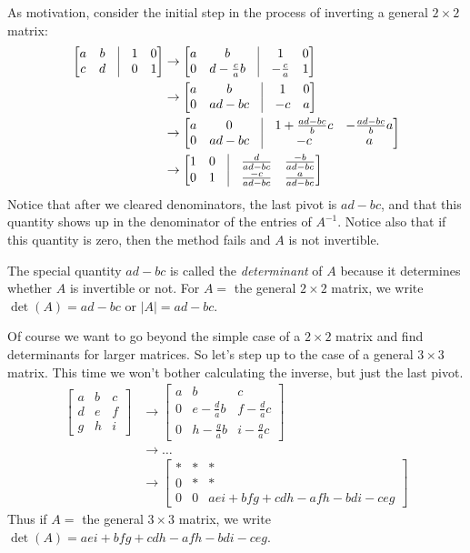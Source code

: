 \documentclass[11pt,oneside]{amsbook}
\theoremstyle{definition}
\theoremstyle{plain}
\theoremstyle{definition}
\theoremstyle{remark}
\numberwithin{equation}{section}
\numberwithin{figure}{section}
\begin{document}
As motivation, consider the initial step in the process of inverting a general $2\times2$ matrix:
\begin{align*}
  \begin{bmatrix}a&b&\vline&1&0\\c&d&\vline&0&1\end{bmatrix}
  &\to\begin{bmatrix}a&b&\vline&1&0\\
    0&d-\frac{c}{a}b&\vline&-\frac{c}{a}&1\end{bmatrix}\\
  &\to\begin{bmatrix}a&b&\vline&1&0\\0&ad-bc&\vline&-c&a\end{bmatrix}\\
  &\to\begin{bmatrix}a&0&\vline&1+\frac{ad-bc}{b}c&-\frac{ad-bc}{b}a\\
    0&ad-bc&\vline&-c&a\end{bmatrix}\\
  &\to\begin{bmatrix}1&0&\vline&\frac{d}{ad-bc}&\frac{-b}{ad-bc}\\
    0&1&\vline&\frac{-c}{ad-bc}&\frac{a}{ad-bc}\end{bmatrix}\\
\end{align*}
Notice that after we cleared denominators, the last pivot is $ad-bc$, and that this quantity shows up in the denominator of the entries of $A^{-1}$. Notice also that if this quantity is zero, then the method fails and $A$ is not invertible.

The special quantity $ad-bc$ is called the \emph{determinant} of $A$ because it determines whether $A$ is invertible or not. For $A=$ the general $2\times2$ matrix, we write $\det(A)=ad-bc$ or $|A|=ad-bc$.

Of course we want to go beyond the simple case of a $2\times2$ matrix and find determinants for larger matrices. So let's step up to the case of a general $3\times3$ matrix. This time we won't bother calculating the inverse, but just the last pivot.
\begin{align*}
  \begin{bmatrix}a&b&c\\d&e&f\\g&h&i\end{bmatrix}
  &\to\begin{bmatrix}a&b&c\\0&e-\frac dab&f-\frac dac
    \\0&h-\frac gab&i-\frac gac\end{bmatrix}\\
  &\to\ldots\\
  &\to\begin{bmatrix}*&*&*\\0&*&*\\0&0&aei+bfg+cdh-afh-bdi-ceg\end{bmatrix}
\end{align*}
Thus if $A=$ the general $3\times3$ matrix, we write $\det(A)=aei+bfg+cdh-afh-bdi-ceg$.
\end{document}
